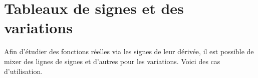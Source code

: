 \documentclass[12pt, a4paper]{article}
\begin{document}
\section{Tableaux de signes et des variations}

Afin d'étudier des fonctions réelles via les signes de leur dérivée, il est possible de mixer des lignes de signes et d'autres pour les variations. Voici des cas d'utilisation.
 
\end{document}
